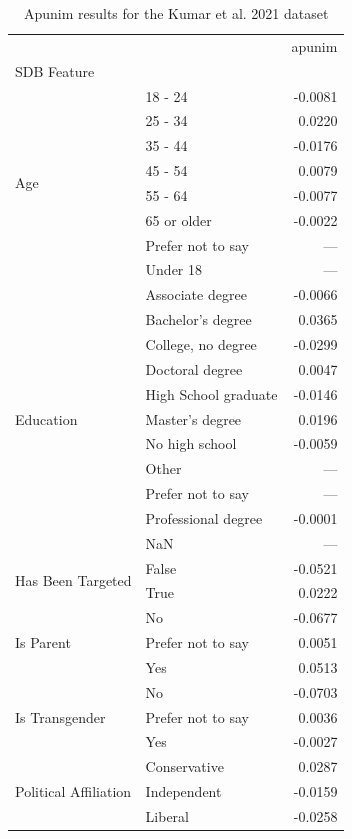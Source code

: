 \begin{table}[h!]
\caption{Apunim results for the Kumar et al. 2021 dataset}
\label{tab:kumar_apunim_only}
\scriptsize
\begin{tabular}{llr}
\toprule
 &  & apunim \\
SDB Feature &  &  \\
\midrule
\multirow[t]{8}{*}{Age} & 18 - 24 & -0.0081 \\
 & 25 - 34 & 0.0220 \\
 & 35 - 44 & -0.0176 \\
 & 45 - 54 & 0.0079 \\
 & 55 - 64 & -0.0077 \\
 & 65 or older & -0.0022 \\
 & Prefer not to say & --- \\
 & Under 18 & --- \\
\cline{1-3}
\multirow[t]{11}{*}{Education} & Associate degree & -0.0066 \\
 & Bachelor's degree & 0.0365 \\
 & College, no degree & -0.0299 \\
 & Doctoral degree & 0.0047 \\
 & High School graduate & -0.0146 \\
 & Master's degree & 0.0196 \\
 & No high school & -0.0059 \\
 & Other & --- \\
 & Prefer not to say & --- \\
 & Professional degree & -0.0001 \\
 & NaN & --- \\
\cline{1-3}
\multirow[t]{2}{*}{Has Been Targeted} & False & -0.0521 \\
 & True & 0.0222 \\
\cline{1-3}
\multirow[t]{3}{*}{Is Parent} & No & -0.0677 \\
 & Prefer not to say & 0.0051 \\
 & Yes & 0.0513 \\
\cline{1-3}
\multirow[t]{3}{*}{Is Transgender} & No & -0.0703 \\
 & Prefer not to say & 0.0036 \\
 & Yes & -0.0027 \\
\cline{1-3}
\multirow[t]{5}{*}{Political Affiliation} & Conservative & 0.0287 \\
 & Independent & -0.0159 \\
 & Liberal & -0.0258 \\

\end{tabular}
\end{table}
